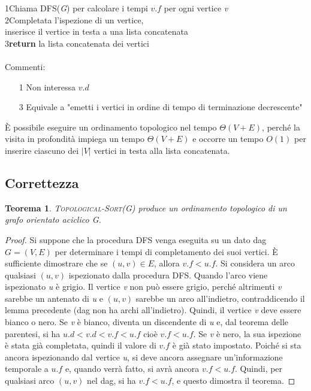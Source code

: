 \documentclass[10pt, a4paper]{report}
\newtheorem{theorem}{Teorema}[chapter]
\newcommand\firsttab[1][0.5cm]{\hspace*{#1}}
\newcommand\secondtab[1][1cm]{\hspace*{#1}}
\begin{document}
1\firsttab Chiama \textsc{DFS(\textit{G})} per calcolare i tempi $v.f$ per ogni vertice \textit{v}\\
2\firsttab Completata l'ispezione di un vertice,\\
\secondtab inserisce il vertice in testa a una lista concatenata\\
3\firsttab\textbf{return} la lista concatenata dei vertici\\\\
Commenti:
\begin{enumerate}
\item[1]Non interessa $v.d$
\item[3]Equivale a "emetti i vertici in ordine di tempo di terminazione decrescente"
\end{enumerate}
È possibile eseguire un ordinamento topologico nel tempo $\Theta(V + E)$, perché la visita in profondità impiega un tempo $\Theta(V + E)$ e occorre un tempo $O(1)$ per inserire ciascuno dei $|V|$ vertici in testa alla lista concatenata.
\subsection{Correttezza}
\begin{theorem}
\textsc{Topological-Sort(\textit{G})} produce un ordinamento topologico di un grafo orientato aciclico \textit{G}.
\end{theorem}
\begin{proof}
Si suppone che la procedura \textsc{DFS} venga eseguita su un dato dag $G = (V,E)$ per determinare i tempi di completamento dei suoi vertici. È sufficiente dimostrare che se $(u,v) \in E$, allora $v.f < u.f$. Si considera un arco qualsiasi $(u,v)$ ispezionato dalla procedura \textsc{DFS}. Quando l'arco viene ispezionato \textit{u} è grigio. Il vertice \textit{v} non può essere grigio, perché altrimenti \textit{v} sarebbe un antenato di \textit{u} e $(u,v)$ sarebbe un arco all'indietro, contraddicendo il lemma precedente (dag non ha archi all'indietro). Quindi, il vertice \textit{v} deve essere bianco o nero. Se \textit{v} è bianco, diventa un discendente di \textit{u} e, dal teorema delle parentesi, si ha $u.d < v.d < v.f < u.f$ cioè $v.f < u.f$. Se \textit{v} è nero, la sua ispezione è stata già completata, quindi il valore di $v.f$ è già stato impostato. Poiché si sta ancora ispezionando dal vertice \textit{u}, si deve ancora assegnare un'informazione temporale a $u.f$ e, quando verrà fatto, si avrà ancora $v.f < u.f$. Quindi, per qualsiasi arco $(u,v)$ nel dag, si ha $v.f < u.f$, e questo dimostra il teorema.
\end{proof}
\end{document}
